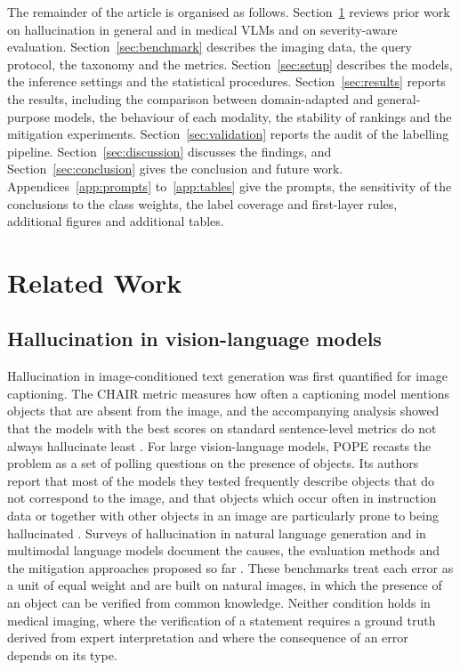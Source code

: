 \documentclass[11pt,a4paper]{article}
\begin{document}
The remainder of the article is organised as follows. Section~\ref{sec:related} reviews prior work on hallucination in general and in medical VLMs and on severity-aware evaluation. Section~\ref{sec:benchmark} describes the imaging data, the query protocol, the taxonomy and the metrics. Section~\ref{sec:setup} describes the models, the inference settings and the statistical procedures. Section~\ref{sec:results} reports the results, including the comparison between domain-adapted and general-purpose models, the behaviour of each modality, the stability of rankings and the mitigation experiments. Section~\ref{sec:validation} reports the audit of the labelling pipeline. Section~\ref{sec:discussion} discusses the findings, and Section~\ref{sec:conclusion} gives the conclusion and future work. Appendices~\ref{app:prompts} to~\ref{app:tables} give the prompts, the sensitivity of the conclusions to the class weights, the label coverage and first-layer rules, additional figures and additional tables.

\section{Related Work}
\label{sec:related}


\subsection{Hallucination in vision-language models}
\label{subsec:rw_vlm}

Hallucination in image-conditioned text generation was first quantified for image captioning. The CHAIR metric measures how often a captioning model mentions objects that are absent from the image, and the accompanying analysis showed that the models with the best scores on standard sentence-level metrics do not always hallucinate least \citep{rohrbach2018chair}. For large vision-language models, POPE recasts the problem as a set of polling questions on the presence of objects. Its authors report that most of the models they tested frequently describe objects that do not correspond to the image, and that objects which occur often in instruction data or together with other objects in an image are particularly prone to being hallucinated \citep{li2023pope}. Surveys of hallucination in natural language generation and in multimodal language models document the causes, the evaluation methods and the mitigation approaches proposed so far \citep{ji2023survey,bai2024hallucination}. These benchmarks treat each error as a unit of equal weight and are built on natural images, in which the presence of an object can be verified from common knowledge. Neither condition holds in medical imaging, where the verification of a statement requires a ground truth derived from expert interpretation and where the consequence of an error depends on its type.
\end{document}
